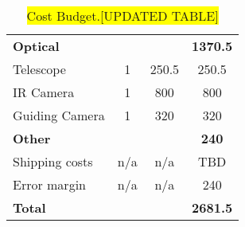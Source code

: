 \begin{table}[H]
\begin{tabular}{|l|c|c|c|}
\rowcolor[HTML]{9B9B9B}
\textbf{Optical} &  &  & \textbf{1370.5}  \\
Telescope & 1 & 250.5 & 250.5  \\
IR Camera & 1 & 800 & 800  \\
Guiding Camera & 1 & 320 & 320  \\

\rowcolor[HTML]{9B9B9B}
\textbf{Other} &  &  & \textbf{240}  \\
Shipping costs & n/a & n/a & TBD  \\
Error margin & n/a & n/a & 240  \\
\hline
\textbf{Total} &  &  & \textbf{2681.5}  \\
\hline
\end{tabular}
\caption{\colorbox{yellow}{Cost Budget.[UPDATED TABLE]}}
\label{table:mass-and-cost-budget}
\end{table}

\raggedbottom